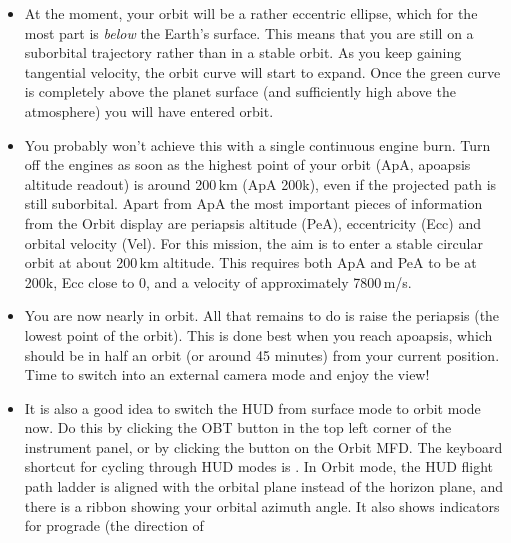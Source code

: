 \documentclass[Orbiter User Manual.tex]{subfiles}
\begin{document}
\begin{itemize}
		MFDs. This shows the shape of your current orbit (the green ellipse) in
		relation to the planet surface (they grey circle), together with a list
		of orbital parameters along the left side of the display. You should
		switch the display to \emph{current orbital plane} projection mode, by
		clicking the  button until Prj SHP is shown in the top right
		corner of the display. Also select altitude readouts by clicking the
		 button so that the PeR and ApR entries in the data column
		change to PeA and ApA (periapsis altitude and apoapsis altitude above
		ground), respectively.
	\item At the moment, your orbit will be a rather eccentric ellipse, which
		for the most part is \emph{below} the Earth's surface. This means that
		you are still on a suborbital trajectory rather than in a stable orbit.
		As you keep gaining tangential velocity, the orbit curve will start to
		expand. Once the green curve is completely above the planet surface (and
		sufficiently high above the atmosphere) you will have entered orbit. 
	\item You probably won't achieve this with a single continuous engine burn.
		Turn off the engines as soon as the highest point of your orbit (ApA,
		apoapsis altitude readout) is around 200\,km (ApA 200k), even if the
		projected path is still suborbital. Apart from ApA the most important
		pieces of information from the Orbit display are periapsis altitude
		(PeA), eccentricity (Ecc) and orbital velocity (Vel). For this mission,
		the aim is to enter a stable circular orbit at about 200\,km altitude.
		This requires both ApA and PeA to be at 200k, Ecc close to 0, and a
		velocity of approximately 7800\,m/s.
	\item You are now nearly in orbit. All that remains to do is raise the
		periapsis (the lowest point of the orbit). This is done best when you
		reach apoapsis, which should be in half an orbit (or around 45 minutes)
		from your current position. Time to switch into an external camera mode
		and enjoy the view!
	\item It is also a good idea to switch the HUD from surface mode to orbit
		mode now. Do this by clicking the OBT button in the top left
		corner of the instrument panel, or by clicking the  button
		on the Orbit MFD.
		The keyboard shortcut for cycling through HUD modes is . In
		Orbit mode, the HUD flight path ladder is aligned with the orbital plane
		instead of the horizon plane, and there is a ribbon showing your orbital
		azimuth angle. It also shows indicators for prograde (the direction of

\end{itemize}
\end{document}
